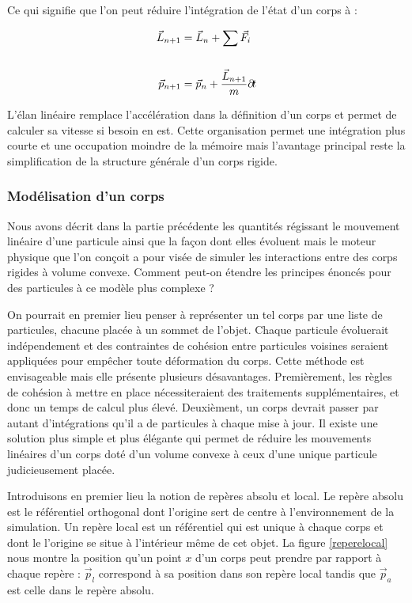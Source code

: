 Ce qui signifie que l'on peut réduire l'intégration de l'état d'un
corps à :

\begin{align*}
  \vec{L}_{n+1} &= \vec{L}_n + {\sum \vec{F}_i} \\ \\
  \vec{p}_{n+1} &= \vec{p}_n + \frac{\vec{L}_{n+1}}{m} \partial \! t \\
\end{align*}

L'élan linéaire remplace l'accélération dans la définition d'un corps
et permet de calculer sa vitesse si besoin en est. Cette organisation
permet une intégration plus courte et une occupation moindre de la
mémoire mais l'avantage principal reste la simplification de la
structure générale d'un corps rigide.

\subsubsection{Modélisation d'un corps}

Nous avons décrit dans la partie précédente les quantités régissant le
mouvement linéaire d'une particule ainsi que la façon dont elles
évoluent mais le moteur physique que l'on conçoit a pour visée de
simuler les interactions entre des corps rigides à volume
convexe. Comment peut-on étendre les principes énoncés pour des
particules à ce modèle plus complexe ?

On pourrait en premier lieu penser à représenter un tel corps par une
liste de particules, chacune placée à un sommet de l'objet. Chaque
particule évoluerait indépendement et des contraintes de cohésion
entre particules voisines seraient appliquées pour empêcher toute
déformation du corps. Cette méthode est envisageable mais elle
présente plusieurs désavantages. Premièrement, les règles de cohésion
à mettre en place nécessiteraient des traitements supplémentaires, et
donc un temps de calcul plus élevé. Deuxièment, un corps devrait
passer par autant d'intégrations qu'il a de particules à chaque mise à
jour. Il existe une solution plus simple et plus élégante qui permet
de réduire les mouvements linéaires d'un corps doté d'un volume
convexe à ceux d'une unique particule judicieusement placée.

Introduisons en premier lieu la notion de repères absolu et local. Le
repère absolu est le référentiel orthogonal dont l'origine sert de
centre à l'environnement de la simulation. Un repère local est un
référentiel qui est unique à chaque corps et dont le l'origine se
situe à l'intérieur même de cet objet. La figure \ref{reperelocal}
nous montre la position qu'un point $x$ d'un corps peut prendre par
rapport à chaque repère : $\vec{p}_l$ correspond à sa position
dans son repère local tandis que $\vec{p}_a$ est celle dans le
repère absolu.

